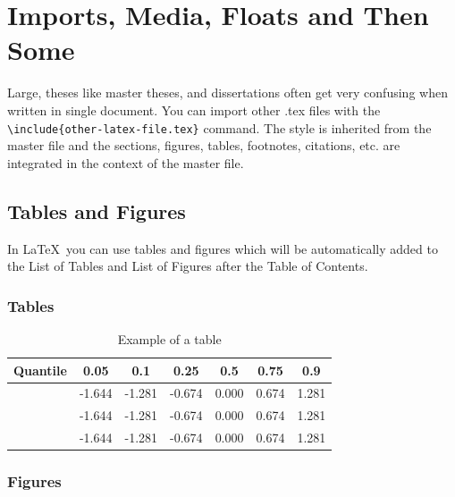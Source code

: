 \chapter{Imports, Media, Floats and Then Some}

Large, theses like master theses, and dissertations often get very confusing when written in single document. You can import other .tex files with the\\\texttt{\textbackslash include\{other-latex-file.tex\}} command. The style is inherited from the master file and the sections, figures, tables, footnotes, citations, etc. are integrated in the context of the master file.

\section{Tables and Figures}
In \LaTeX\ you can use tables and figures which will be automatically added to the List of Tables and List of Figures after the Table of Contents.

\subsection{Tables}

\begin{table}[ht]
\begin{center}
        \begin{tabu}{
            X
            S[table-format=-1.3]
            S[table-format=-1.3]
            S[table-format=-1.3]
            S[table-format=-1.3]
            S[table-format=-1.3]
            S[table-format=-1.3]}
            \toprule
            {Quantile} & 0.05 & 0.1 & 0.25 & 0.5 & 0.75 & 0.9 \\ 
            \midrule
             & -1.644 & -1.281 & -0.674 & 0.000 & 0.674 & 1.281 \\ 
             & -1.644 & -1.281 & -0.674 & 0.000 & 0.674 & 1.281 \\ 
             & -1.644 & -1.281 & -0.674 & 0.000 & 0.674 & 1.281 \\ 
             \bottomrule
        \end{tabu}
	\caption{Example of a table}
	\label{table:1}
\end{center}
\end{table}

\subsection{Figures}

